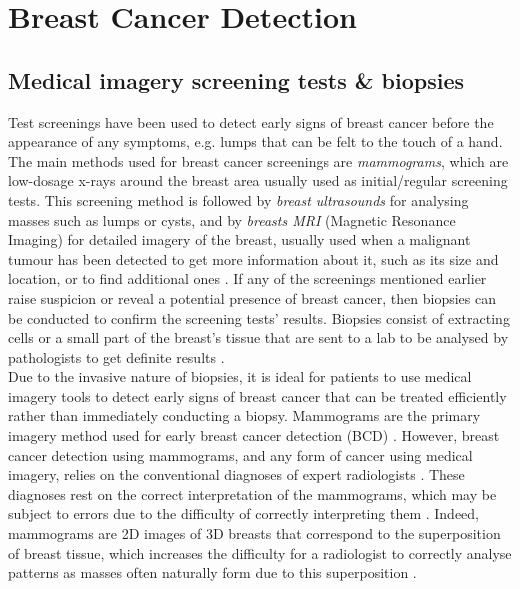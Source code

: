 
\section{Breast Cancer Detection}

\subsection{Medical imagery screening tests \& biopsies}
\label{sec:litreview-bcd-medical-imagery}

Test screenings have been used to detect early signs of breast cancer before the appearance of any symptoms, e.g. lumps that can be felt to the touch of a hand. The main methods used for breast cancer screenings are \textit{mammograms}, which are low-dosage x-rays around the breast area usually  used as initial/regular screening tests. This screening method is followed by \textit{breast ultrasounds} for analysing masses such as lumps or cysts, and by \textit{breasts MRI} (Magnetic Resonance Imaging) for detailed imagery of the breast, usually used when a malignant tumour has been detected to get more information about it, such as its size and location, or to find additional ones \citep{americanCancerSociety2019}. If any of the screenings mentioned earlier raise suspicion or reveal a potential presence of breast cancer, then biopsies can be conducted to confirm the screening tests' results. Biopsies consist of extracting cells or a small part of the breast's tissue that are sent to a lab to be analysed by pathologists to get definite results \citep{martin2019}.\\

Due to the invasive nature of biopsies, it is ideal for patients to use medical imagery tools to detect early signs of breast cancer that can be treated efficiently rather than immediately conducting a biopsy. Mammograms are the primary imagery method used for early breast cancer detection (BCD) \citep{Ramos-Pollan2012}. However, breast cancer detection using mammograms, and any form of cancer using medical imagery, relies on the conventional diagnoses of expert radiologists \citep{Osareh2010}. These diagnoses rest on the correct interpretation of the mammograms, which may be subject to errors due to the difficulty of correctly interpreting them \citep{Elter2009}. Indeed, mammograms are 2D images of 3D breasts that correspond to the superposition of breast tissue, which increases the difficulty for a radiologist to correctly analyse patterns as masses often naturally form due to this superposition \citep{Elter2009}.

